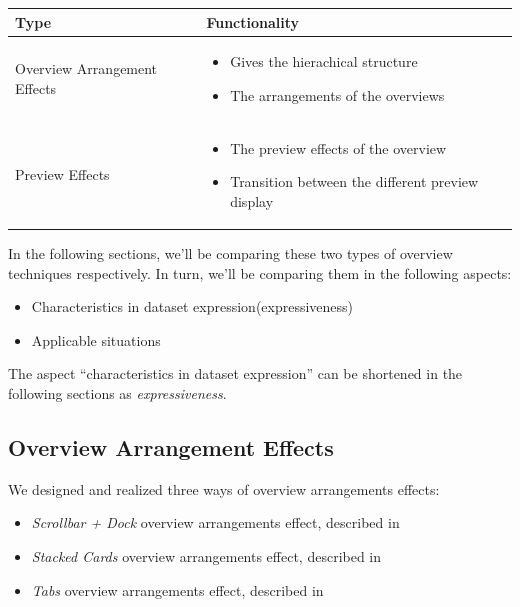 \begingroup
\centering
\begin{tabu} to .97\textwidth { | X[1, r, m] | X[3, l, m] | }
    \hline
    Type & Functionality \\
    \hline\hline
    Overview Arrangement Effects &
    \vspace{.85em}\begin{itemize}
        \item Gives the hierachical structure
        \item The arrangements of the overviews
    \end{itemize} \\
    \hline
    Preview Effects &
    \vspace{.85em}\begin{itemize}
        \item The preview effects of the overview
        \item Transition between the different preview display
    \end{itemize} \\
    \hline
\end{tabu}
\label{tbl:types}
\endgroup

In the following sections, we'll be comparing these two types of overview techniques respectively. In turn, we'll be comparing them in the following aspects:

\begin{itemize}
    \item Characteristics in dataset expression(expressiveness)
    \item Applicable situations
\end{itemize}

The aspect ``characteristics in dataset expression'' can be shortened in the following sections as \emph{expressiveness}.

\subsection{Overview Arrangement Effects}

We designed and realized three ways of overview arrangements effects:

\begin{itemize}
    \item \emph{Scrollbar + Dock} overview arrangements effect, described in 
    \item \emph{Stacked Cards} overview arrangements effect, described in 
    \item \emph{Tabs} overview arrangements effect, described in 
\end{itemize}

